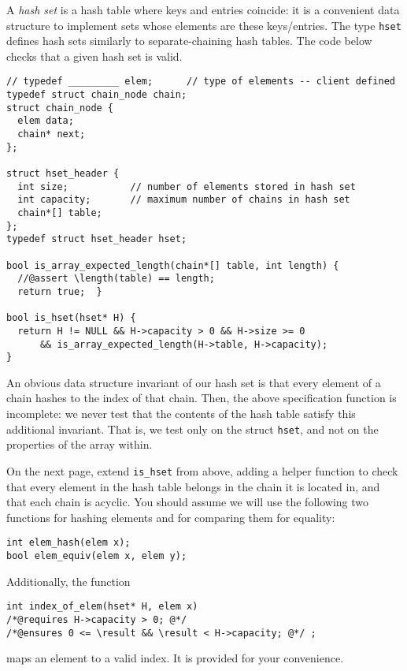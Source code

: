 \clearpage
{}

A \emph{hash set} is a hash table where keys and entries coincide: it
is a convenient data structure to implement sets whose elements are these
keys/entries.  The type \lstinline'hset' defines hash sets similarly to
separate-chaining hash tables.  The code below checks that a given
hash set is valid.
\begin{lstlisting}
// typedef _________ elem;      // type of elements -- client defined
typedef struct chain_node chain;
struct chain_node {
  elem data;
  chain* next;
};

struct hset_header {
  int size;           // number of elements stored in hash set
  int capacity;       // maximum number of chains in hash set
  chain*[] table;
};
typedef struct hset_header hset;

bool is_array_expected_length(chain*[] table, int length) {
  //@assert \length(table) == length;
  return true;  }

bool is_hset(hset* H) {
  return H != NULL && H->capacity > 0 && H->size >= 0
      && is_array_expected_length(H->table, H->capacity);
}
\end{lstlisting}

An obvious data structure invariant of our hash set is that every
element of a chain hashes to the index of that chain.  Then, the above
specification function is incomplete: we never test that the contents
of the hash table satisfy this additional invariant.  That is, we test
only on the struct \lstinline'hset', and not on the properties of the
array within.

On the next page, extend \lstinline'is_hset' from above, adding a helper
function to check that every element in the hash table belongs in the
chain it is located in, and that each chain is acyclic.  You should
assume we will use the following two functions for hashing elements
and for comparing them for equality:
\enlargethispage{1ex}
\begin{lstlisting}
int elem_hash(elem x);
bool elem_equiv(elem x, elem y);
\end{lstlisting}
Additionally, the function
\begin{lstlisting}[belowskip=0pt]
int index_of_elem(hset* H, elem x)
/*@requires H->capacity > 0; @*/
/*@ensures 0 <= \result && \result < H->capacity; @*/ ;
\end{lstlisting}
maps an element to a valid index.  It is provided for your convenience.



